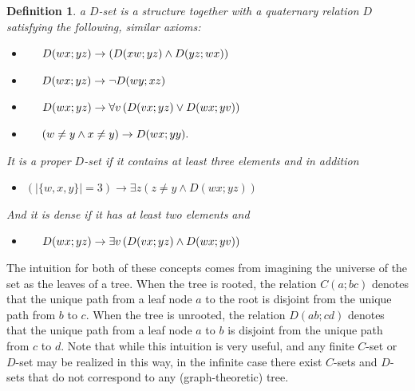 \documentclass{amsart}
\newtheorem{definition}[theorem]{Definition}
\begin{document}
\begin{definition}

a $D$-set is a structure together with a quaternary relation $D$ satisfying the following, similar axioms:

    \begin{itemize}
        \item[(D1)] $ \hspace{0.2in} D(wx;yz) \rightarrow \left(D(xw; yz) \wedge D(yz; wx) \right)$ 
        \item[(D2)]  $\hspace{0.2in} D(wx;yz) \rightarrow \neg D(wy;xz)$
        \item[(D3)]  $\hspace{0.2in}  D(wx;yz) \rightarrow \forall v\left(D(vx;yz) \vee D(wx;yv) \right)$
       \item[(D4)] $\hspace{0.2in} \left(w \neq y \wedge x \neq y \right) \rightarrow D(wx;yy).$
    \end{itemize}

    It is a \emph{proper} $D$-set if it contains at least three elements and in addition

    \begin{itemize}
        \item[(D5)] \hspace{0.2in} $\left(|\{w, x, y\}| = 3\right) \rightarrow \exists z \left(z \neq y \wedge D(wx;yz)\right)$
    \end{itemize}

    And it is \emph{dense} if it has at least two elements and

    \begin{itemize}
        \item[(D6)]  $\hspace{0.2in} D(wx;yz) \rightarrow \exists v \left(D(vx;yz) \wedge D(wx;yv) \right)$
    \end{itemize}
\end{definition}

The intuition for both of these concepts comes from imagining the universe of the set as the leaves of a tree. When the tree is rooted, the relation $C(a; bc)$ denotes that the unique path from a leaf node $a$ to the root is disjoint from  the unique path from $b$ to $c$. When the tree is unrooted, the relation $D(ab;cd)$ denotes that the unique path from a leaf node $a$ to $b$ is disjoint from  the unique path from $c$ to $d$. Note that while this intuition is very useful, and any finite $C$-set or $D$-set may be realized in this way, in the infinite case there exist $C$-sets and $D$-sets that do not correspond to any (graph-theoretic) tree.
\end{document}
